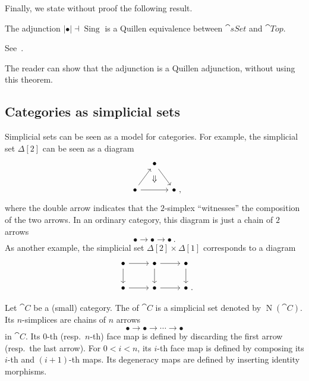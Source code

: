 Finally, we state without proof the following result.

\begin{theorem}
    The adjunction $|{\bullet}|\dashv\operatorname{Sing}$
    is a Quillen equivalence between $\cat{sSet}$ and $\cat{Top}$.
\end{theorem}

See~\cite[Theorem 3.6.7]{hovey}.

The reader can show that the adjunction is a Quillen adjunction,
without using this theorem.

\subsection{Categories as simplicial sets}

Simplicial sets can be seen as a model for categories.
For example, the simplicial set $\Delta[2]$ can be seen as a diagram
\[\begin{tikzcd}[row sep=2em,column sep=1em]
    &\bullet\ar[dr] \\
    \bullet\ar[ur]\ar[rr]\ar[rr,phantom,bend left=45,"\Downarrow"] && \bullet\rlap{\ ,}
\end{tikzcd}\]
where the double arrow indicates that
the $2$-simplex ``witnesses'' the composition of the two arrows.
In an ordinary category, this diagram is just a chain of $2$ arrows
\[\bullet\to\bullet\to\bullet\ .\]
As another example, the simplicial set $\Delta[2]\times\Delta[1]$
corresponds to a diagram
\[\begin{tikzcd}
    \bullet\ar[d]\ar[r] & \bullet\ar[d]\ar[r] & \bullet\ar[d] \\
    \bullet\ar[r] & \bullet\ar[r] & \bullet\rlap{\ .}
\end{tikzcd}\]

\begin{definition}
    Let $\cat C$ be a (small) category.
    The  of $\cat C$ is a simplicial set denoted by $\operatorname{N}(\cat C)$.
    Its $n$-simplices are chains of $n$ arrows
    \[\bullet\to\bullet\to\cdots\to\bullet\]
    in $\cat C$.
    Its $0$-th (resp.\ $n$-th) face map is defined by discarding the first arrow (resp.\ the last arrow).
    For $0<i<n$, its $i$-th face map is defined by composing its $i$-th and $(i+1)$-th maps.
    Its degeneracy maps are defined by inserting identity morphisms.
\end{definition}

